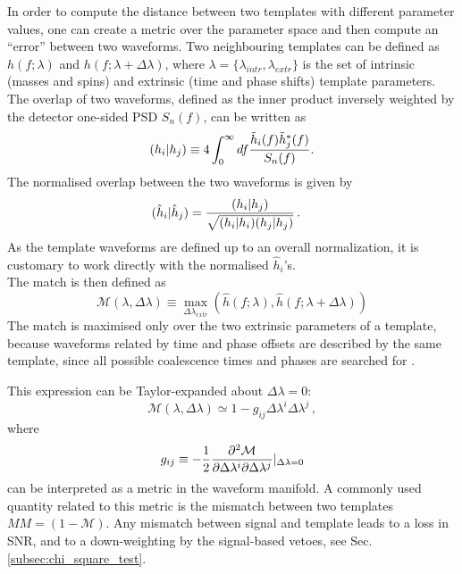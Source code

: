 \documentclass[binding=0.6cm, LaM]{sapthesis}
\begin{document}
	In order to compute the distance between two templates with different parameter values, 
	one can create a metric over the parameter space and then compute an ``error'' between two waveforms.
	Two neighbouring templates can be defined as $h(f;\lambda)$ and $h(f;\lambda + \Delta \lambda)$,
        where $\lambda = \{\lambda_{intr}, \lambda_{extr}\}$ is the set of
        intrinsic (masses and spins) and extrinsic (time and phase shifts) template parameters.
	The overlap of two waveforms, defined as the inner product inversely weighted by the detector one-sided  PSD $S_n(f)$, 
	can be written as  
        \begin{equation}
          (h_i| h_j)  \equiv 4 \int_{0}^{\infty} df {{\tilde h_i(f) \tilde h^*_j(f)} \over {S_n(f)}}.
        \end{equation}
	The normalised overlap between the two waveforms is given by
        \begin{align}
          (\hat{h}_i|\hat{h}_j)& = {{(h_i|h_j)} \over {\sqrt{(h_i| h_i)(h_j| h_j)}}}\,.
        \end{align}
	As the template waveforms are defined up to an overall normalization, 
	it is customary to work directly with the normalised $\hat{h}_i$'s. \\
	The match is then defined as
        \begin{equation}
          \mathcal{M}(\lambda, \Delta \lambda) \equiv \max_{\Delta \lambda_{extr}} (\hat h(f;\lambda), \hat h(f;\lambda + \Delta \lambda))
        \end{equation}
	The match is maximised only over the two extrinsic parameters of a template, 
	because waveforms related by time and phase offsets
	are described by the same template, 
	since all possible coalescence times and phases are searched for \cite{29}.

	This expression can be Taylor-expanded about $\Delta \lambda = 0$:
        \begin{equation}
          \mathcal{M}(\lambda, \Delta \lambda) \simeq 1 - g_{ij} \Delta \lambda^i \Delta \lambda^j\,,
        \end{equation}
	where 
        \begin{equation}
          g_{ij} \equiv -{1 \over 2} {{\partial^2\mathcal{M}} \over {\partial  \Delta \lambda^i  \partial \Delta \lambda^j}}\vert_{\Delta \lambda = 0}
        \end{equation}
	can be interpreted as a metric in the waveform manifold.  A commonly used quantity related to this metric
	is the mismatch between two templates $MM = (1 − \mathcal{M})$.
	Any mismatch between signal and template leads to a loss in SNR, 
	and to a down-weighting by the signal-based vetoes, see Sec.\,\ref{subsec:chi_square_test}.
\end{document}

